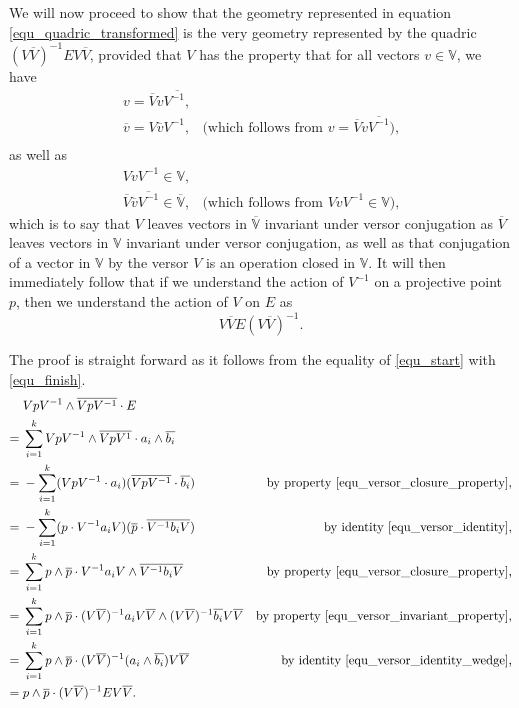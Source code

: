 \documentclass{birkjour}
\theoremstyle{definition}
\theoremstyle{remark}
\numberwithin{equation}{section}
\newcommand{\V}{\mathbb{V}}
\begin{document}
We will now proceed to show that the geometry represented in
equation \eqref{equ_quadric_transformed} is the very geometry
represented by the quadric $(V\overline{V})^{-1}EV\overline{V}$,
provided that $V$ has the property that for all vectors $v\in\V$,
we have
\begin{equation}\label{equ_versor_invariant_property}
\begin{array}{cl}
v=\overline{V}v\overline{V^{-1},} \\
\overline{v}=V\overline{v}V^{-1}, & \mbox{(which follows from $v=\overline{V}v\overline{V^{-1}}$),} \\
\end{array}
\end{equation}
as well as
\begin{equation}\label{equ_versor_closure_property}
\begin{array}{cl}
VvV^{-1}\in\V, \\
\overline{V}\overline{v}\overline{V^{-1}}\in\overline{\V}, & \mbox{(which follows from $VvV^{-1}\in\V$),}
\end{array}
\end{equation}
which is to say that $V$ leaves vectors in $\overline{\V}$ invariant under versor
conjugation as $\overline{V}$ leaves vectors in $\V$ invariant under versor conjugation,
as well as that conjugation of a vector in $\V$ by the versor $V$ is an operation closed in $\V$.
It will then immediately follow
that if we understand the action of $V^{-1}$ on a projective point $p$, then
we understand the action of $V$ on $E$ as
\begin{equation}
V\overline{V}E(V\overline{V})^{-1}.
\end{equation}

The proof is straight forward as it follows from the equality of \eqref{equ_start} with \eqref{equ_finish}.
{\allowdisplaybreaks
\begin{align}
 & VpV^{-1}\wedge\overline{VpV^{-1}}\cdot E\label{equ_start} \\
=\;& \sum_{i=1}^k VpV^{-1}\wedge\overline{VpV^{1}}\cdot a_i\wedge\overline{b_i}\label{equ_second} \\
=\;& -\sum_{i=1}^k (VpV^{-1}\cdot a_i)(\overline{VpV^{-1}}\cdot\overline{b_i}) & \mbox{by property \eqref{equ_versor_closure_property},} \\
=\;& -\sum_{i=1}^k (p\cdot V^{-1}a_iV)(\overline{p}\cdot\overline{V^{-1}b_iV}) & \mbox{by identity \eqref{equ_versor_identity},} \\
=\;& \sum_{i=1}^k p\wedge\overline{p}\cdot V^{-1}a_iV\wedge\overline{V^{-1}b_iV} &\mbox{by property \eqref{equ_versor_closure_property},} \\
=\;& \sum_{i=1}^k p\wedge\overline{p}\cdot (V\overline{V})^{-1}a_iV\overline{V}\wedge
(V\overline{V})^{-1}\overline{b_i}V\overline{V} &\mbox{by property \eqref{equ_versor_invariant_property},}\label{equ_third_to_last} \\
=\;& \sum_{i=1}^k p\wedge\overline{p}\cdot (V\overline{V})^{-1}(a_i\wedge\overline{b_i})V\overline{V} & \mbox{by identity \eqref{equ_versor_identity_wedge},} \\
=\;& p\wedge\overline{p}\cdot (V\overline{V})^{-1}EV\overline{V}.\label{equ_finish}
\end{align}}
\end{document}
